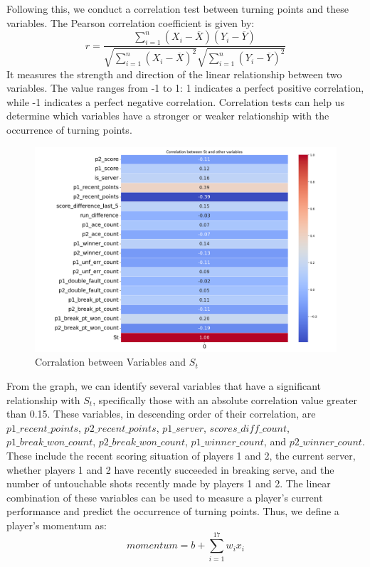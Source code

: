 \documentclass[UTF8]{ctexart} %
\begin{document}
Following this, we conduct a correlation test between turning points and these variables. The Pearson correlation 
coefficient is given by:
\[r = \frac{\sum_{i=1}^{n}(X_i-\overline{X})(Y_i-\overline{Y})}{\sqrt{\sum_{i=1}^{n}(X_i-\overline{X})^2}\sqrt{\sum_{i=1}^{n}(Y_i-\overline{Y})^2}}\]
It measures the strength and direction of the linear relationship between two variables. The value ranges from -1 
to 1: 1 indicates a perfect positive correlation, while -1 indicates a perfect negative correlation. Correlation 
tests can help us determine which variables have a stronger or weaker relationship with the occurrence of turning 
points.

\begin{figure}[H]
    \centering
    \includegraphics[width=\textwidth]{./graph/relativity.png}
    \caption{Corralation between Variables and $S_t$}
\end{figure}

From the graph, we can identify several variables that have a significant relationship with \(S_t\), specifically 
those with an absolute correlation value greater than 0.15. These variables, in descending order of their 
correlation, are \(p1\_recent\_points\), \(p2\_recent\_points\), \(p1\_server\), \(scores\_diff\_count\), 
\(p1\_break\_won\_count\), \(p2\_break\_won\_count\), \(p1\_winner\_count\), and \(p2\_winner\_count\). 
These include the recent scoring situation of players 1 and 2, the current server, whether players 1 and 2 have 
recently succeeded in breaking serve, and the number of untouchable shots recently made by players 1 and 2. The 
linear combination of these variables can be used to measure a player's current performance and predict the 
occurrence of turning points. Thus, we define a player's momentum as:
\[momentum = b + \sum_{i=1}^{17}w_ix_i\]
\end{document}
